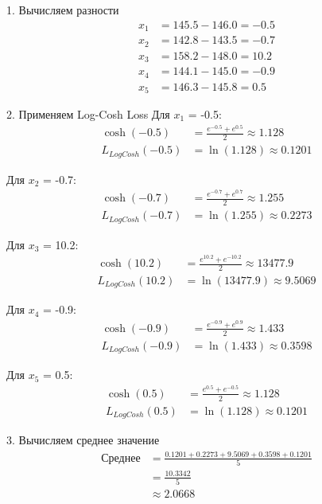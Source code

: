 \documentclass[12pt]{article}
\theoremstyle{definition}
\theoremstyle{definition}
\theoremstyle{definition}
\theoremstyle{remark}
\theoremstyle{remark}
\begin{document}
1. Вычисляем разности
\[
\begin{aligned}
x_1 &= 145.5 - 146.0 = -0.5 \\
x_2 &= 142.8 - 143.5 = -0.7 \\
x_3 &= 158.2 - 148.0 = 10.2 \\
x_4 &= 144.1 - 145.0 = -0.9 \\
x_5 &= 146.3 - 145.8 = 0.5
\end{aligned}
\]

2. Применяем Log-Cosh Loss
Для $x_1$ = -0.5:
\[
\begin{aligned}
\cosh(-0.5) &= \frac{e^{-0.5} + e^{0.5}}{2} \approx 1.128 \\
L_{LogCosh}(-0.5) &= \ln(1.128) \approx 0.1201
\end{aligned}
\]

Для $x_2$ = -0.7:
\[
\begin{aligned}
\cosh(-0.7) &= \frac{e^{-0.7} + e^{0.7}}{2} \approx 1.255 \\
L_{LogCosh}(-0.7) &= \ln(1.255) \approx 0.2273
\end{aligned}
\]

Для $x_3$ = 10.2:
\[
\begin{aligned}
\cosh(10.2) &= \frac{e^{10.2} + e^{-10.2}}{2} \approx 13477.9 \\
L_{LogCosh}(10.2) &= \ln(13477.9) \approx 9.5069
\end{aligned}
\]

Для $x_4$ = -0.9:
\[
\begin{aligned}
\cosh(-0.9) &= \frac{e^{-0.9} + e^{0.9}}{2} \approx 1.433 \\
L_{LogCosh}(-0.9) &= \ln(1.433) \approx 0.3598
\end{aligned}
\]

Для $x_5$ = 0.5:
\[
\begin{aligned}
\cosh(0.5) &= \frac{e^{0.5} + e^{-0.5}}{2} \approx 1.128 \\
L_{LogCosh}(0.5) &= \ln(1.128) \approx 0.1201
\end{aligned}
\]

3. Вычисляем среднее значение
\[
\begin{aligned}
\text{Среднее} &= \frac{0.1201 + 0.2273 + 9.5069 + 0.3598 + 0.1201}{5} \\
&= \frac{10.3342}{5} \\
&\approx 2.0668
\end{aligned}
\]
\end{document}
